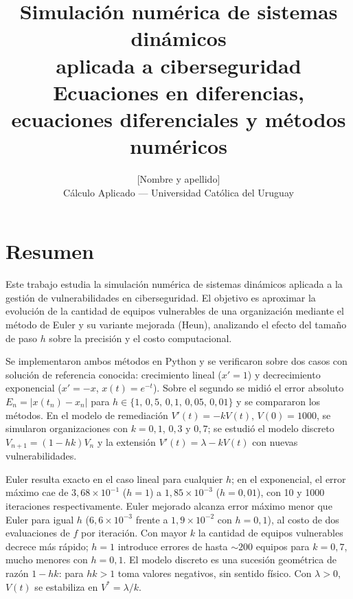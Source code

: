 \documentclass[11pt,a4paper]{article}
\title{\textbf{Simulación numérica de sistemas dinámicos\\aplicada a ciberseguridad}\\
\large Ecuaciones en diferencias, ecuaciones diferenciales y métodos numéricos}
\author{[Nombre y apellido]\\
\small Cálculo Aplicado — Universidad Católica del Uruguay}
\date{}
\begin{document}
\maketitle

\section*{Resumen}

Este trabajo estudia la simulación numérica de sistemas dinámicos aplicada a
la gestión de vulnerabilidades en ciberseguridad. El objetivo es aproximar la
evolución de la cantidad de equipos vulnerables de una organización mediante
el método de Euler y su variante mejorada (Heun), analizando el efecto del
tamaño de paso $h$ sobre la precisión y el costo computacional.

Se implementaron ambos métodos en Python y se verificaron sobre dos casos con
solución de referencia conocida: crecimiento lineal ($x'=1$) y decrecimiento
exponencial ($x'=-x$, $x(t)=e^{-t}$). Sobre el segundo se midió el error
absoluto $E_n=|x(t_n)-x_n|$ para $h\in\{1,\,0{,}5,\,0{,}1,\,0{,}05,\,0{,}01\}$
y se compararon los métodos. En el modelo de remediación $V'(t)=-kV(t)$,
$V(0)=1000$, se simularon organizaciones con $k=0{,}1$, $0{,}3$ y $0{,}7$;
se estudió el modelo discreto $V_{n+1}=(1-hk)V_n$ y la extensión
$V'(t)=\lambda-kV(t)$ con nuevas vulnerabilidades.

Euler resulta exacto en el caso lineal para cualquier $h$; en el exponencial,
el error máximo cae de $3{,}68\times10^{-1}$ ($h=1$) a $1{,}85\times10^{-3}$
($h=0{,}01$), con 10 y 1000 iteraciones respectivamente. Euler mejorado
alcanza error máximo menor que Euler para igual $h$ ($6{,}6\times10^{-3}$ frente
a $1{,}9\times10^{-2}$ con $h=0{,}1$), al costo de dos evaluaciones de $f$ por
iteración. Con mayor $k$ la cantidad de equipos vulnerables decrece más
rápido; $h=1$ introduce errores de hasta $\sim200$ equipos para $k=0{,}7$,
mucho menores con $h=0{,}1$. El modelo discreto es una sucesión geométrica de
razón $1-hk$: para $hk>1$ toma valores negativos, sin sentido físico. Con
$\lambda>0$, $V(t)$ se estabiliza en $V^*=\lambda/k$.

\end{document}
